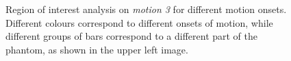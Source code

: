 \begin{figure}[ht]
    \caption{Region of interest analysis on \textit{motion 3} for different motion onsets.
    Different colours correspond to different onsets of motion, while different groups of bars correspond to a different part of the phantom, as shown in the upper left image.}
    \label{fig:appendixmotion3ROI}
\end{figure}
